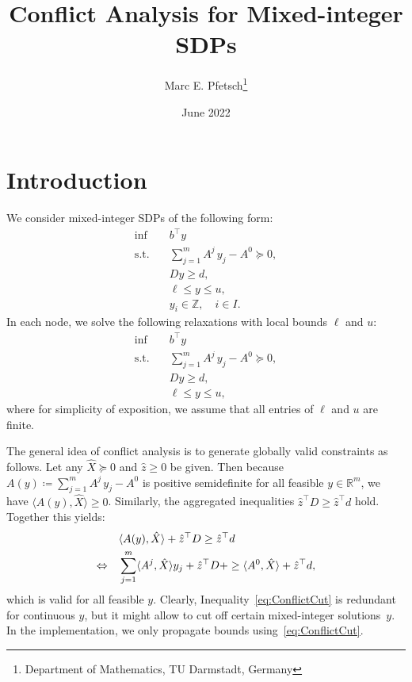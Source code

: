 \documentclass[10pt, a4paper]{article}
\title{Conflict Analysis for Mixed-integer SDPs}
\author{Marc E. Pfetsch\thanks{Department of Mathematics, TU Darmstadt, Germany}}
\date{June 2022}
\newcommand{\define}{\coloneqq}
\newcommand{\skal}[2]{\langle{#1},{#2}\rangle}
\newcommand{\T}{^{\top}}
\newcommand{\R}{\mathds{R}}
\newcommand{\Z}{\mathds{Z}}
\begin{document}
\maketitle

\section{Introduction}

We consider mixed-integer SDPs of the following form:
\begin{equation}\label{MISDP}
  \begin{aligned}
    \inf \quad & b\T y \\
    \text{s.t.} \quad & \sum_{j=1}^m A^j\, y_j - A^0 \succeq 0, \\
    & D y \geq d,\\
    & \ell \leq y \leq u,\\
    & y_i \in \Z,\quad i \in I.
  \end{aligned}
\end{equation}
In each node, we solve the following relaxations with local bounds $\ell$
and $u$:
\begin{equation}\label{SDP-D}
  \begin{aligned}
    \inf \quad & b\T y \\
    \text{s.t.} \quad & \sum_{j=1}^m A^j\, y_j - A^0 \succeq 0, \\
    & D y \geq d,\\
    & \ell \leq y \leq u,
  \end{aligned}
\end{equation}
where for simplicity of exposition, we assume that all entries of $\ell$
and $u$ are finite.

The general idea of conflict analysis is to generate globally valid
constraints as follows. Let any $\hat{X} \succeq 0$ and $\hat{z} \geq 0$ be
given. Then because $A(y) \define \sum_{j=1}^m A^j\, y_j - A^0$ is positive
semidefinite for all feasible $y \in \R^m$, we have
$\skal{A(y)}{\hat{X}} \geq 0$.  Similarly, the aggregated inequalities
$\hat{z}\T D \geq \hat{z}\T d$ hold. Together this yields:
\begin{align}
  & \skal{A(y)}{\hat{X}} + \hat{z}\T D \geq \hat{z}\T d\notag\\
  \Leftrightarrow\quad
  & \sum_{j=1}^m \skal{A^j}{\hat{X}} y_j + \hat{z}\T D + \geq
    \skal{A^0}{\hat{X}} + \hat{z}\T d,\label{eq:ConflictCut}
\end{align}
which is valid for all feasible $y$. Clearly,
Inequality~\eqref{eq:ConflictCut} is redundant for continuous $y$, but it
might allow to cut off certain mixed-integer solutions~$y$. In the implementation,
we only propagate bounds using~\eqref{eq:ConflictCut}.
\end{document}
